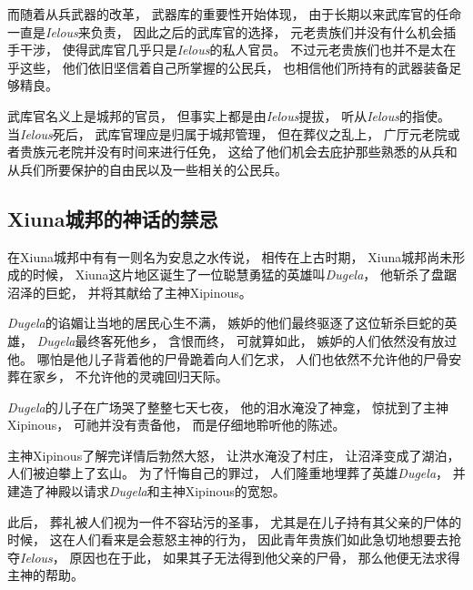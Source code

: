 \documentclass[12pt, a4paper]{ctexart}
\begin{document}
        而随着从兵武器的改革，
        武器库的重要性开始体现，
        由于长期以来武库官的任命一直是\emph{Ielous}来负责，
        因此之后的武库官的选择，
        元老贵族们并没有什么机会插手干涉，
        使得武库官几乎只是\emph{Ielous}的私人官员。
        不过元老贵族们也并不是太在乎这些，
        他们依旧坚信着自己所掌握的公民兵，
        也相信他们所持有的武器装备足够精良。

        武库官名义上是城邦的官员，
        但事实上都是由\emph{Ielous}提拔，
        听从\emph{Ielous}的指使。
        当\emph{Ielous}死后，
        武库官理应是归属于城邦管理，
        但在葬仪之乱上，
        广厅元老院或者贵族元老院并没有时间来进行任免，
        这给了他们机会去庇护那些熟悉的从兵和从兵们所要保护的自由民以及一些相关的公民兵。
    \subsection{Xiuna城邦的神话的禁忌}
        在Xiuna城邦中有有一则名为安息之水传说，
        相传在上古时期，
        Xiuna城邦尚未形成的时候，
        Xiuna这片地区诞生了一位聪慧勇猛的英雄叫\emph{Dugela}，
        他斩杀了盘踞沼泽的巨蛇，
        并将其献给了主神Xipinous。

        \emph{Dugela}的谄媚让当地的居民心生不满，
        嫉妒的他们最终驱逐了这位斩杀巨蛇的英雄，
        \emph{Dugela}最终客死他乡，
        含恨而终，
        可就算如此，
        嫉妒的人们依然没有放过他。
        哪怕是他儿子背着他的尸骨跪着向人们乞求，
        人们也依然不允许他的尸骨安葬在家乡，
        不允许他的灵魂回归天际。

        \emph{Dugela}的儿子在广场哭了整整七天七夜，
        他的泪水淹没了神龛，
        惊扰到了主神Xipinous，
        可祂并没有责备他，
        而是仔细地聆听他的陈述。

        主神Xipinous了解完详情后勃然大怒，
        让洪水淹没了村庄，
        让沼泽变成了湖泊，
        人们被迫攀上了玄山。
        为了忏悔自己的罪过，
        人们隆重地埋葬了英雄\emph{Dugela}，
        并建造了神殿以请求\emph{Dugela}和主神Xipinous的宽恕。

        此后，
        葬礼被人们视为一件不容玷污的圣事，
        尤其是在儿子持有其父亲的尸体的时候，
        这在人们看来是会惹怒主神的行为，
        因此青年贵族们如此急切地想要去抢夺\emph{Ielous}，
        原因也在于此，
        如果其子无法得到他父亲的尸骨，
        那么他便无法求得主神的帮助。
        





        
\end{document}
